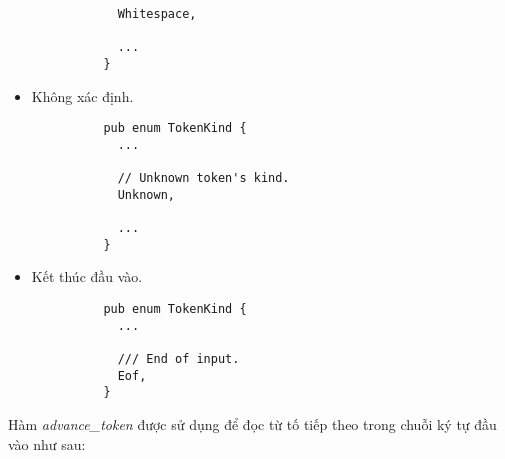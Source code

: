 \begin{itemize}
\begin{lstlisting}
            Whitespace,

            ...
          }
        \end{lstlisting}
  \item Không xác định.
        \begin{lstlisting}
          pub enum TokenKind {
            ...
            
            // Unknown token's kind.
            Unknown,
            
            ...
          }
        \end{lstlisting}
  \item Kết thúc đầu vào.
        \begin{lstlisting}
          pub enum TokenKind {
            ...
            
            /// End of input.
            Eof,
          }
        \end{lstlisting}
\end{itemize}

Hàm \textit{advance\_token} được sử dụng để đọc từ tố tiếp theo trong chuỗi ký tự đầu vào như sau:

